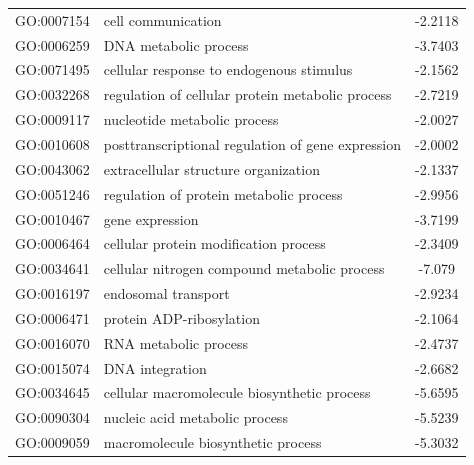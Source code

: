 \documentclass[11pt,twoside,a4paper]{report}
\begin{document}
\begin{appendices}
\begin{longtable}{@{\extracolsep{\fill}}llc@{}}
    GO:0007154 & cell communication                                                     & -2.2118       \\
    GO:0006259 & DNA metabolic process                                                  & -3.7403       \\
    GO:0071495 & cellular response to endogenous stimulus                               & -2.1562       \\
    GO:0032268 & regulation of cellular protein metabolic process                       & -2.7219       \\
    GO:0009117 & nucleotide metabolic process                                           & -2.0027       \\
    GO:0010608 & posttranscriptional regulation of gene expression                      & -2.0002       \\
    GO:0043062 & extracellular structure organization                                   & -2.1337       \\
    GO:0051246 & regulation of protein metabolic process                                & -2.9956       \\
    GO:0010467 & gene expression                                                        & -3.7199       \\
    GO:0006464 & cellular protein modification process                                  & -2.3409       \\
    GO:0034641 & cellular nitrogen compound metabolic process                           & -7.079        \\
    GO:0016197 & endosomal transport                                                    & -2.9234       \\
    GO:0006471 & protein ADP-ribosylation                                               & -2.1064       \\
    GO:0016070 & RNA metabolic process                                                  & -2.4737       \\
    GO:0015074 & DNA integration                                                        & -2.6682       \\
    GO:0034645 & cellular macromolecule biosynthetic process                            & -5.6595       \\
    GO:0090304 & nucleic acid metabolic process                                         & -5.5239       \\
    GO:0009059 & macromolecule biosynthetic process                                     & -5.3032       \\

\end{longtable}
\end{appendices}
\end{document}
